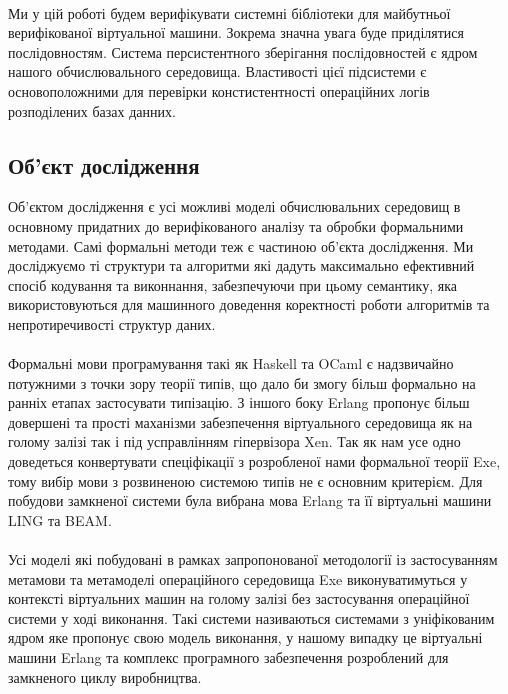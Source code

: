 \documentclass[11pt,oneside]{article}
\begin{document}
   \paragraph{}
   Ми у цій роботі будем верифікувати системні бібліотеки для майбутньої верифікованої
   віртуальної машини. Зокрема значна увага буде приділятися послідовностям.
   Система персистентного зберігання послідовностей є ядром нашого
   обчислювального середовища. Властивості цієї підсистеми є основоположними
   для перевірки констистентності операційних логів розподілених базах данних.

\newpage
\subsection{Об’єкт дослідження}
\vspace{0.5cm}

   Об’єктом дослідження є усі можливі моделі обчислювальних середовищ в основному придатних
   до верифікованого аналізу та обробки формальними методами. Самі формальні методи теж є
   частиною об’єкта дослідження. Ми досліджуємо ті структури та алгоритми які дадуть
   максимально ефективний спосіб кодування та виконнання, забезпечуючи при цьому семантику,
   яка використовуються для машинного доведення коректності роботи алгоритмів та непротиречивості структур даних.

   \paragraph{}
   Формальні мови програмування такі як Haskell та OCaml є надзвичайно потужними з точки зору теорії типів,
   що дало би змогу більш формально на ранніх етапах застосувати типізацію. З іншого боку Erlang пропонує
   більш довершені та прості маханізми забезпечення віртуального середовища як на голому залізі так і
   під усправлінням гіпервізора Xen. Так як нам усе одно доведеться конвертувати спеціфікації з
   розробленої нами формальної теорії Exe, тому вибір мови з розвиненою системою типів не є основним критерієм.
   Для побудови замкненої системи була вибрана мова Erlang та її віртуальні машини LING та BEAM.

   \paragraph{}
   Усі моделі які побудовані в рамках запропонованої методології із застосуванням
   метамови та метамоделі операційного середовища Exe виконуватимуться у контексті
   віртуальних машин на голому залізі без застосування операційної системи у ході виконання.
   Такі системи називаються системами з уніфікованим ядром яке пропонує свою модель виконання,
   у нашому випадку це віртуальні машини Erlang та комплекс програмного забезпечення
   розроблений для замкненого циклу виробництва.
\end{document}
